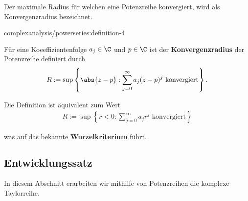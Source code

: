 \documentclass[letterpaper,10pt,german]{jupyterBook}
\begin{document}
\par
Der maximale Radius für welchen eine Potenzreihe konvergiert, wird als Konvergenzradius bezeichnet.
\begin{definition}{}{complexanalysis/powerseries:definition-4}



\par
Für eine Koeeffizientenfolge \(a_j\in\C\) und \(p\in\C\) ist der \textbf{Konvergenzradius} der Potenzreihe definiert durch
\begin{align*}
R :=\sup\left\{\abs{z - p}: \sum_{j=0}^\infty a_j (z-p)^j \text{ konvergiert}\right\}.
\end{align*}\end{definition}

\par
Die Definition ist äquivalent zum Wert
\begin{align*}
R :=\sup\left\{r<0: \sum_{j=0}^\infty a_j r^j\text{ konvergiert} \right\}
\end{align*}
\par
was auf das bekannte \textbf{Wurzelkriterium} führt.


\subsection{Entwicklungssatz}
\label{\detokenize{complexanalysis/powerseries:entwicklungssatz}}
\par
In diesem Abschnitt erarbeiten wir mithilfe von Potenzreihen die komplexe Taylorreihe.
\end{document}
